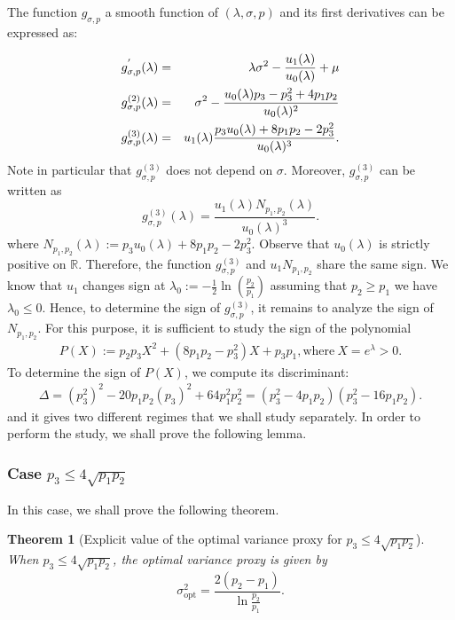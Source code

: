 \documentclass[a4paper, 10pt]{article}
\newcommand{\beq}{\begin{equation}}
\newcommand{\eeq}{\end{equation}}
\newcommand{\bea}{\begin{eqnarray}}
\newcommand{\eea}{\end{eqnarray}}
\newtheorem{theorem}{Theorem}[section]
\theoremstyle{definition}
\begin{document}
The function $g_{\sigma,p}$ a smooth function of $(\lambda,\sigma,p)$ and its first derivatives can be expressed as:

\bea g^{'}_{\sigma,p}(\lambda)&=&\lambda \sigma^2 -\frac{u_1(\lambda)}{u_0(\lambda)} + \mu \cr 
g^{(2)}_{\sigma,p}(\lambda)&=& \sigma^2-\frac{u_0(\lambda)p_3-p_3^2+4p_1p_2}{u_0(\lambda)^2}\cr
g^{(3)}_{\sigma, p}(\lambda)&=& u_1(\lambda)\frac{p_3u_0(\lambda)+8p_1p_2-2p_3^2}{u_0(\lambda)^3}.
\eea
Note in particular that $g^{(3)}_{\sigma, p}$ does not depend on $\sigma$. Moreover, $g^{(3)}_{\sigma, p}$ can be written as
\beq\label{g3} g^{(3)}_{\sigma, p}(\lambda) = \frac{u_1(\lambda)N_{p_1,p_2}(\lambda)}{u_0(\lambda)^3}. \eeq
where $N_{p_1,p_2}(\lambda) := p_3u_0(\lambda)+8p_1p_2-2p_3^2$. Observe that $u_0(\lambda)$ is strictly positive on $\mathbb{R}$. Therefore, the function $g_{\sigma, p}^{(3)}$ and $u_1 N_{p_1, p_2} $ share the same sign. We know that $u_1$ changes sign at $\lambda_0 := -\frac{1}{2}\ln(\frac{p_2}{p_1})$ assuming that $p_2\geq p_1$ we have $\lambda_0 \leq 0$. Hence, to determine the sign of $g^{(3)}_{\sigma, p}$, it remains to analyze the sign of $N_{p_1, p_2}$. For this purpose, it is sufficient to  study the sign of the polynomial
\bea P(X) :=p_2p_3X^2+(8p_1p_2-p_3^2)X+p_3p_1, \text{where}\  X = e^{\lambda} > 0.\eea 
To determine the sign of $P(X)$, we compute its discriminant:
\bea \Delta = (p_3^2)^2 - 20p_1p_2(p_3)^2 + 64p_1^2p_2^2= (p_3^2-4p_1p_2)(p_3^2-16p_1p_2). \eea 
and it gives two different regimes that we shall study separately. In order to perform the study, we shall prove the following lemma.


\subsubsection{Case $p_3\leq 4\sqrt{p_1p_2}$}
In this case, we shall prove the following theorem.
\begin{theorem}[Explicit value of the optimal variance proxy for $p_3\leq 4\sqrt{p_1p_2}$]\label{TheoRegime1} When $p_3\leq 4\sqrt{p_1p_2}$, the optimal variance proxy is given by
\beq \sigma_{\mathrm{opt}}^2= \frac{2(p_2-p_1)}{\ln \frac{p_2}{p_1}}.\eeq
\end{theorem}
\end{document}
